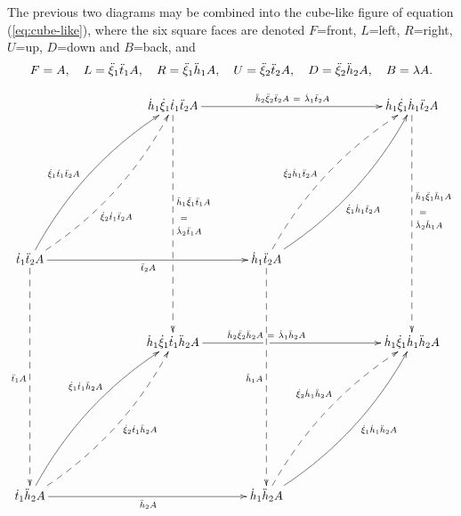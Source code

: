 \bigskip
The previous two diagrams may be combined into the cube-like figure 
of equation (\ref{eq:cube-like}), where the six square faces are denoted 
$F$=front, $L$=left, $R$=right, $U$=up, $D$=down and $B$=back, and
$$
F = A, \quad 
L = \ddot{\xi}_1 \ddot{t}_1 A, \quad 
R = \ddot{\xi}_1 \ddot{h}_1 A, \quad
U = \ddot{\xi}_2 \ddot{t}_2 A, \quad 
D = \ddot{\xi}_2 \ddot{h}_2 A, \quad
B = \lambda A. 
$$


\begin{equation} \label{eq:cube-like}
\vcenter{\xymatrix  @C=1.3pc %
{
  && && \dhho\dxo\dtto\ddttt A 
        \ar[rrrrrr]^{\ddhht\ddxt\ddttt A ~=~ \dlo\ddttt A}
        \ar@{-->}'[dddd][dddddd]^(-0.7){\ddhho\ddxo\ddtto A}
            ^(-0.5){~=~} ^(-0.35){\dlt\ddtto A}
        && && && \dhho\dxo\dhho\ddttt A 
                 \ar@{-->}[dddddd]^(0.38){\ddhho\ddxo\ddhho A}
                   ^(0.45){~=~}^(0.5){\dlt\ddhho A} \\ %
  && && && && && \\ %
  && && && && && \\ %
  && && && && && \\ %
\dtto\ddttt A 
\ar[rrrrrr]_{\ddttt A} \ar@{-->}[dddddd]_{\ddtto A} 
\ar@/^3ex/[rrrruuuu]^(0.45){\dxo\dtto\ddttt A}
\ar@{-->}@/^-3ex/[rrrruuuu]_(0.4){\dxt\dtto\ddttt A} 
  && && && \dhho\ddttt A 
           \ar@{-->}[dddddd]_{\ddhho A} 
           \ar@{-->}@/^3ex/[rrrruuuu]^(0.45){\dxt\dhho\ddttt A}
           \ar@/^-3ex/[rrrruuuu]_(0.45){\dxo\dhho\ddttt A} 
         && && \\ %
  && && && && && \\ %
  && && \dhho\dxo\dtto\ddhht A 
        \ar'[rr][rrrrrr]^(0.0){\ddhht\ddxt\ddhht A ~=~ \dlo\ddhht A}
        && && && \dhho\dxo\dhho\ddhht A \\ %
  && && && && && \\ %
  && && && && && \\ %
  && && && && && \\ %
\dtto\ddhht A 
\ar[rrrrrr]_{\ddhht A} 
\ar@/^3ex/[rrrruuuu]^(0.6){\dxo\dtto\ddhht A}
\ar@{-->}@/^-3ex/[rrrruuuu]_(0.55){\dxt\dtto\ddhht A} 
  && && && \dhho\ddhht A 
           \ar@{-->}@/^3ex/[rrrruuuu]^(0.55){\dxt\dhho\ddhht A}
           \ar@/^-3ex/[rrrruuuu]_(0.55){\dxo\dhho\ddhht A} 
         && && \\ %
  && && && && && \\ %
}}
\end{equation}

